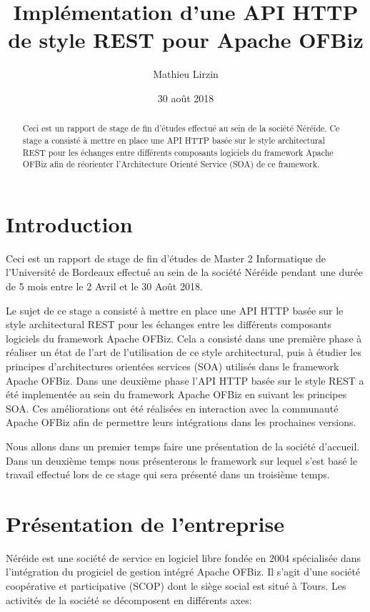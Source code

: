 \documentclass[a4paper, 11pt]{report}
\title{Implémentation d'une API HTTP de style REST pour Apache OFBiz}
\author{Mathieu Lirzin}
\date{30 août 2018}
\begin{document}
\maketitle

\begin{abstract}
  Ceci est un rapport de stage de fin d'études effectué au sein de la
  société Néréide. Ce stage a consisté à mettre en place une API HTTP
  basée sur le style architectural REST pour les échanges entre
  différents composants logiciels du framework Apache OFBiz afin de
  réorienter l'Architecture Orienté Service (SOA) de ce framework.
\end{abstract}

\tableofcontents

\chapter*{Introduction}

Ceci est un rapport de stage de fin d'études de Master 2 Informatique
de l'Université de Bordeaux effectué au sein de la société Néréide
pendant une durée de 5 mois entre le 2 Avril et le 30 Août 2018.

Le sujet de ce stage a consisté à mettre en place une API HTTP basée
sur le style architectural REST pour les échanges entre les différents
composants logiciels du framework Apache OFBiz. Cela a consisté dans
une première phase à réaliser un état de l'art de l'utilisation de ce
style architectural, puis à étudier les principes d'architectures
orientées services (SOA) utilisés dans le framework Apache OFBiz.
Dans une deuxième phase l'API HTTP basée sur le style REST a été
implementée au sein du framework Apache OFBiz en suivant les principes
SOA. Ces améliorations ont été réalisées en interaction avec la
communauté Apache OFBiz afin de permettre leurs intégrations dans les
prochaines versions.

Nous allons dans un premier temps faire une présentation de la société
d'accueil. Dans un deuxième temps nous présenterons le framework sur
lequel s'est basé le travail effectué lors de ce stage qui sera
présenté dans un troisième temps.

\chapter{Présentation de l'entreprise}

Néréide est une société de service en logiciel libre fondée en 2004
spécialisée dans l'intégration du progiciel de gestion intégré Apache
OFBiz. Il s'agit d'une société coopérative et participative (SCOP)
dont le siège social est situé à Tours. Les activités de la société se
décomposent en différents axes:
\end{document}
